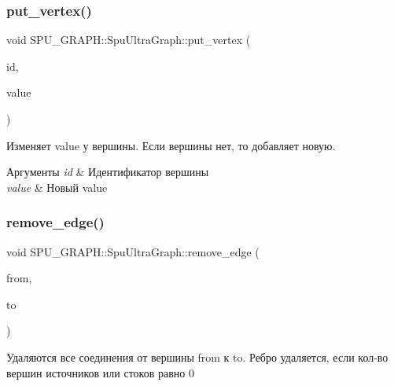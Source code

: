 \subsubsection{\texorpdfstring{put\+\_\+vertex()}{put\_vertex()}\hspace{0.1cm}{\footnotesize\ttfamily [2/2]}}
{\footnotesize\ttfamily void S\+P\+U\+\_\+\+G\+R\+A\+P\+H\+::\+Spu\+Ultra\+Graph\+::put\+\_\+vertex (\begin{DoxyParamCaption}\item[{Spu\+Ultra\+Graph\+::vertex\+\_\+descriptor}]{id,  }\item[{value\+\_\+t}]{value }\end{DoxyParamCaption})}

Изменяет value у вершины. Если вершины нет, то добавляет новую. 
\begin{DoxyParams}{Аргументы}
{\em id} & Идентификатор вершины \\
\hline
{\em value} & Новый value \\
\hline
\end{DoxyParams}
\mbox{\label{class_s_p_u___g_r_a_p_h_1_1_spu_ultra_graph_a25193f9b7e0b9df947d8e9bc82da6fdf}} 
\subsubsection{\texorpdfstring{remove\+\_\+edge()}{remove\_edge()}}
{\footnotesize\ttfamily void S\+P\+U\+\_\+\+G\+R\+A\+P\+H\+::\+Spu\+Ultra\+Graph\+::remove\+\_\+edge (\begin{DoxyParamCaption}\item[{Spu\+Ultra\+Graph\+::vertex\+\_\+descriptor}]{from,  }\item[{Spu\+Ultra\+Graph\+::vertex\+\_\+descriptor}]{to }\end{DoxyParamCaption})}

Удаляются все соединения от вершины from к to. Ребро удаляется, если кол-\/во вершин источников или стоков равно 0 \mbox{\label{class_s_p_u___g_r_a_p_h_1_1_spu_ultra_graph_a16ea4ca22965b3dae74ca8c17b130fd8}} 
